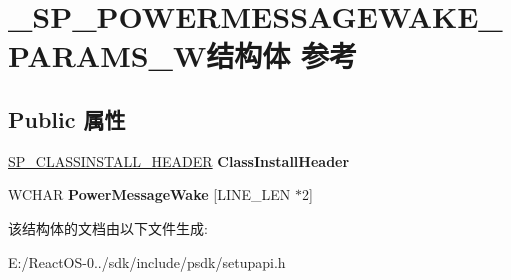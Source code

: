 \hypertarget{struct___s_p___p_o_w_e_r_m_e_s_s_a_g_e_w_a_k_e___p_a_r_a_m_s___w}{}\section{\+\_\+\+S\+P\+\_\+\+P\+O\+W\+E\+R\+M\+E\+S\+S\+A\+G\+E\+W\+A\+K\+E\+\_\+\+P\+A\+R\+A\+M\+S\+\_\+\+W结构体 参考}
\label{struct___s_p___p_o_w_e_r_m_e_s_s_a_g_e_w_a_k_e___p_a_r_a_m_s___w}
\subsection*{Public 属性}
\begin{DoxyCompactItemize}
\item 
\mbox{\label{struct___s_p___p_o_w_e_r_m_e_s_s_a_g_e_w_a_k_e___p_a_r_a_m_s___w_a7ed0a8644eee8f72b50d19196848f7ab}} 
\hyperlink{struct___s_p___c_l_a_s_s_i_n_s_t_a_l_l___h_e_a_d_e_r}{S\+P\+\_\+\+C\+L\+A\+S\+S\+I\+N\+S\+T\+A\+L\+L\+\_\+\+H\+E\+A\+D\+ER} {\bfseries Class\+Install\+Header}
\item 
\mbox{\label{struct___s_p___p_o_w_e_r_m_e_s_s_a_g_e_w_a_k_e___p_a_r_a_m_s___w_a3f73c072b5f05903cb4d9bd224d6e0bd}} 
W\+C\+H\+AR {\bfseries Power\+Message\+Wake} \mbox{[}L\+I\+N\+E\+\_\+\+L\+EN $\ast$2\mbox{]}
\end{DoxyCompactItemize}


该结构体的文档由以下文件生成\+:\begin{DoxyCompactItemize}
\item 
E\+:/\+React\+O\+S-\/0../sdk/include/psdk/setupapi.\+h\end{DoxyCompactItemize}
